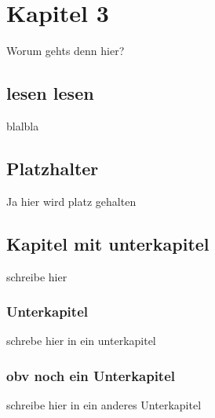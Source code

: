 \chapter{Kapitel 3}
\label{chapter:kapitel3}
Worum gehts denn hier?

\section{lesen lesen}
\label{section:z}

blalbla

\section{Platzhalter}
\label{section:b}

Ja hier wird platz gehalten

\section{Kapitel mit unterkapitel}
\label{section:a}

schreibe hier 

\subsection{Unterkapitel}

schrebe hier in ein unterkapitel

\subsection{obv noch ein Unterkapitel}

schreibe hier in ein anderes Unterkapitel

